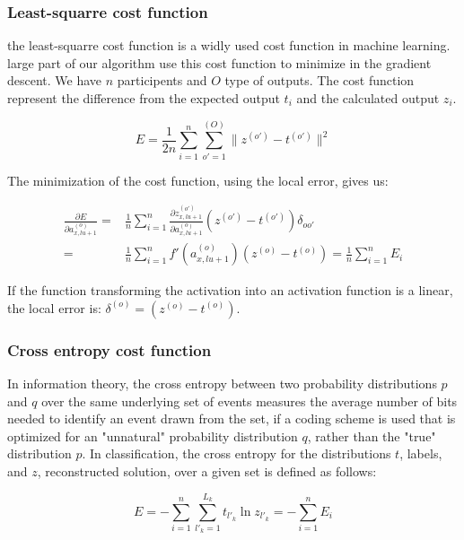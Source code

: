 \documentclass[final, paper=letter,5p,times,twocolumn]{elsarticle}
\begin{document}
\subsubsection{Least-squarre cost function}

the least-squarre cost function is a widly used cost function in machine learning. large part of our algorithm use this cost function to minimize in the gradient descent. We have $n$ participents and $O$ type of outputs. The cost function represent the difference from the expected output $t_{i}$ and the calculated output $z_{i}$.

\begin{equation}
  E = \frac{1}{2n} \sum_{i = 1}^{n} \sum_{o' = 1}^{(O)} \| z^{(o')} - t^{(o')} \|^{2}
  \label{least_squarre}
\end{equation}

The minimization of the cost function, using the local error, gives us:

\begin{equation}
  \begin{split}
    \frac{\partial E}{\partial a_{x,lu+1}^{(o)}} = & \frac{1}{n} \sum_{i = 1}^{n} \frac{\partial z_{x,lu+1}^{(o')}}{\partial a_{x,lu+1}^{(o)}} (z^{(o')} - t^{(o')}) \delta_{oo'} \\
    = & \frac{1}{n} \sum_{i = 1}^{n}  f'(a_{x,lu+1}^{(o)}) (z^{(o)} - t^{(o)}) = \frac{1}{n} \sum_{i = 1}^{n}  E_{i}
  \end{split}
\end{equation}

If the function transforming the activation into an activation function is a linear, the local error is: $\delta^{(o)} = (z^{(o)} - t^{(o)})$.

\subsubsection{Cross entropy cost function}
\label{Cross_entropy_cost_function_sec}

In information theory, the cross entropy between two probability distributions $p$ and $q$ over the same underlying set of events measures the average number of bits needed to identify an event drawn from the set, if a coding scheme is used that is optimized for an "unnatural" probability distribution $q$, rather than the "true" distribution $p$. In classification, the cross entropy for the distributions $t$, labels, and $z$, reconstructed solution, over a given set is defined as follows:

\begin{equation}
  E = - \sum_{i = 1}^{n}\sum_{l'_{k} = 1}^{L_{k}} t_{l'_{k}} \ln z_{l'_{k}} =  - \sum_{i = 1}^{n} E_{i}
  \label{cross_entropy}
\end{equation}
\end{document}
